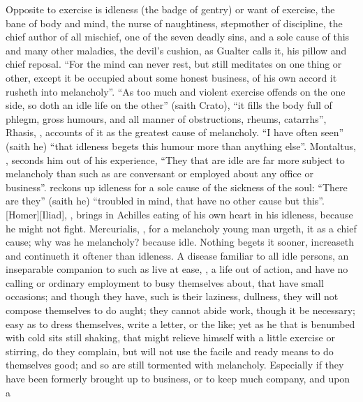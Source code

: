 Opposite to exercise is idleness (the badge of gentry) or want of exercise, the
bane of body and mind, the nurse of naughtiness, stepmother of discipline, the
chief author of all mischief, one of the seven deadly sins, and a sole cause of
this and many other maladies, the devil's cushion, as
Gualter calls it, his pillow and chief reposal. \enquote{For the
mind can never rest, but still meditates on one thing or other, except it be
occupied about some honest business, of his own accord it rusheth into
melancholy}. \enquote{As too much and violent exercise offends on
the one side, so doth an idle life on the other} (saith Crato), \enquote{it fills the
body full of phlegm, gross humours, and all manner of obstructions, rheums,
catarrhs}, \etc{} Rhasis, ,
accounts of it as the greatest cause of melancholy. \enquote{I
have often seen} (saith he) \enquote{that idleness begets this humour more than
anything else}. Montaltus, , seconds him out of his
experience, \enquote{They that are idle are far more subject to
melancholy than such as are conversant or employed about any office or
business}. \Plutarch{} reckons up idleness for a sole cause
of the sickness of the soul: \enquote{There are they} (saith he) \enquote{troubled in mind,
that have no other cause but this}. [Homer][Iliad], ,
brings in Achilles eating of his own heart in his idleness, because he might
not fight. Mercurialis, , for a melancholy
young man urgeth, it as a chief cause; why was he
melancholy? because idle. Nothing begets it sooner, increaseth and continueth
it oftener than idleness. A disease familiar to all idle
persons, an inseparable companion to such as live at ease, , a life out of action, and have no calling or ordinary
employment to busy themselves about, that have small occasions; and though they
have, such is their laziness, dullness, they will not compose themselves to do
aught; they cannot abide work, though it be necessary; easy as to dress
themselves, write a letter, or the like; yet as he that is benumbed with cold
sits still shaking, that might relieve himself with a little exercise or
stirring, do they complain, but will not use the facile and ready means to do
themselves good; and so are still tormented with melancholy. Especially if they
have been formerly brought up to business, or to keep much company, and upon a
